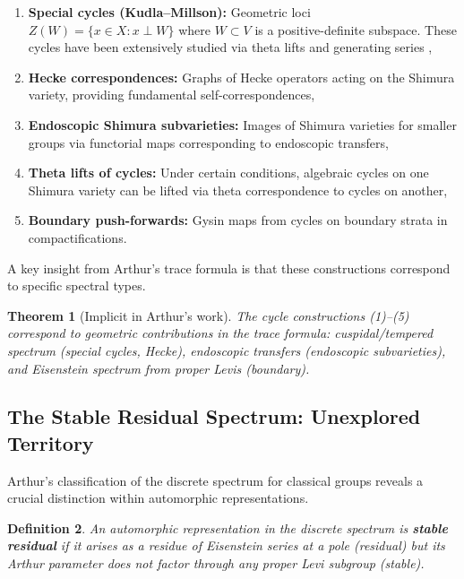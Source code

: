 \documentclass[12pt]{amsart}
\newtheorem{theorem}{Theorem}[section]
\newtheorem{definition}[theorem]{Definition}
\theoremstyle{definition}
\begin{document}
\begin{enumerate}
\item \textbf{Special cycles (Kudla--Millson):} Geometric loci $Z(W) = \{x \in X : x \perp W\}$ where $W \subset V$ is a positive-definite subspace. These cycles have been extensively studied via theta lifts and generating series \cite{Kudla-Millson},

\item \textbf{Hecke correspondences:} Graphs of Hecke operators acting on the Shimura variety, providing fundamental self-correspondences,

\item \textbf{Endoscopic Shimura subvarieties:} Images of Shimura varieties for smaller groups via functorial maps corresponding to endoscopic transfers,

\item \textbf{Theta lifts of cycles:} Under certain conditions, algebraic cycles on one Shimura variety can be lifted via theta correspondence to cycles on another,

\item \textbf{Boundary push-forwards:} Gysin maps from cycles on boundary strata in compactifications.
\end{enumerate}

A key insight from Arthur's trace formula is that these constructions correspond to specific spectral types.

\begin{theorem}[Implicit in Arthur's work]
The cycle constructions (1)--(5) correspond to geometric contributions in the trace formula: cuspidal/tempered spectrum (special cycles, Hecke), endoscopic transfers (endoscopic subvarieties), and Eisenstein spectrum from proper Levis (boundary).
\end{theorem}

\subsection{The Stable Residual Spectrum: Unexplored Territory}

Arthur's classification of the discrete spectrum for classical groups \cite{Arthur} reveals a crucial distinction within automorphic representations.

\begin{definition}
An automorphic representation in the discrete spectrum is \textbf{stable residual} if it arises as a residue of Eisenstein series at a pole (residual) but its Arthur parameter does not factor through any proper Levi subgroup (stable).
\end{definition}
\end{document}
